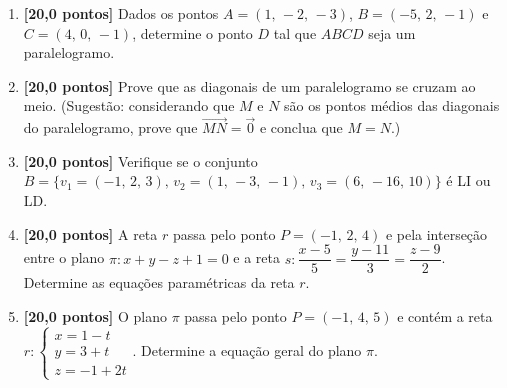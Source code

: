 \documentclass[12pt,a4paper]{article}
\begin{document}
\begin{enumerate}

  \item \textbf{[20,0 pontos]} Dados os pontos $A = (1,\, -2,\, -3)$, 
    $B = (-5,\, 2,\, -1)$ e $C = (4,\, 0,\, -1)$, determine o ponto $D$ tal que
    $ABCD$ seja um paralelogramo.
  
  \item \textbf{[20,0 pontos]} Prove que as diagonais de um paralelogramo se
    cruzam ao meio. (Sugestão: considerando que $M$ e $N$ são os pontos médios
    das diagonais do paralelogramo, prove que $\overrightarrow{MN} = \vec{0}$
    e conclua que $M = N$.)

  \item \textbf{[20,0 pontos]} Verifique se o conjunto 
    $B = \{v_1 = (-1,\, 2,\, 3),\, v_2 = (1,\, -3,\, -1),\, v_3 = (6,\, -16,\, 10)\}$
    é LI ou LD.
    
  \item \textbf{[20,0 pontos]} A reta $r$ passa pelo ponto $P = (-1,\, 2,\, 4)$
    e pela interseção entre o plano $\pi : x + y - z + 1 = 0$ e a reta 
    $s : \dfrac{x - 5}{5} = \dfrac{y - 11}{3} = \dfrac{z - 9}{2}$. Determine 
    as equações paramétricas da reta $r$.

  \item \textbf{[20,0 pontos]} O plano $\pi$ passa pelo ponto
    $P = (-1,\, 4,\, 5)$ e contém a reta
    $r : \begin{cases} x = 1 - t \\ y = 3 + t \\ z = -1 + 2t\end{cases}$.
    Determine a equação geral do plano $\pi$.

\end{enumerate}
\end{document}
